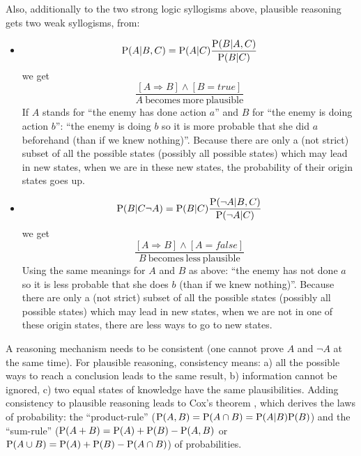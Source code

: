 Also, additionally to the two strong logic syllogisms above, plausible reasoning gets two weak syllogisms, from:
\begin{itemize}
    \item $$\mathrm{P}(A|B,C)=\mathrm{P}(A|C)\frac{\mathrm{P}(B|A,C)}{\mathrm{P}(B|C)}$$ we get $$\frac{[A\Rightarrow B] \wedge [B=true]}{A\ \mathrm{becomes\ more\ plausible}}$$
If $A$ stands for ``the enemy has done action $a$'' and $B$ for ``the enemy is doing action $b$'': 
``the enemy is doing $b$ so it is more probable that she did $a$ beforehand (than if we knew nothing)''. Because there are only a (not strict) subset of all the possible states (possibly all possible states) which may lead in new states, when we are in these new states, the probability of their origin states goes up.
    \item $$\mathrm{P}(B| C\neg A)=\mathrm{P}(B|C)\frac{\mathrm{P}(\neg A|B,C)}{\mathrm{P}(\neg A|C)}$$ we get $$\frac{[A\Rightarrow B] \wedge [A=false]}{B\ \mathrm{becomes\ less\ plausible}}$$
    Using the same meanings for $A$ and $B$ as above: ``the enemy has not done $a$ so it is less probable that she does $b$ (than if we knew nothing)''. Because there are only a (not strict) subset of all the possible states (possibly all possible states) which may lead in new states, when we are not in one of these origin states, there are less ways to go to new states.
\end{itemize}

A reasoning mechanism needs to be consistent (one cannot prove $A$ and $\neg A$ at the same time). For plausible reasoning, consistency means: a) all the possible ways to reach a conclusion leads to the same result, b) information cannot be ignored, c) two equal states of knowledge have the same plausibilities. Adding consistency to plausible reasoning leads to Cox's theorem \citep{Cox46}, which derives the laws of probability: the ``product-rule'' ($\mathrm{P}(A,B)=\mathrm{P}(A\cap B)=\mathrm{P}(A|B)\mathrm{P}(B)$) and the ``sum-rule'' ($\mathrm{P}(A+B)=\mathrm{P}(A)+\mathrm{P}(B)-\mathrm{P}(A,B)$ or $\mathrm{P}(A\cup B) = \mathrm{P}(A)+\mathrm{P}(B)-\mathrm{P}(A\cap B)$) of probabilities. 


